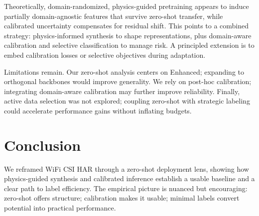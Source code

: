 \documentclass[journal]{IEEEtran}
\begin{document}
Theoretically, domain-randomized, physics-guided pretraining appears to induce partially domain-agnostic features that survive zero-shot transfer, while calibrated uncertainty compensates for residual shift. This points to a combined strategy: physics-informed synthesis to shape representations, plus domain-aware calibration and selective classification to manage risk. A principled extension is to embed calibration losses or selective objectives during adaptation.

Limitations remain. Our zero-shot analysis centers on Enhanced; expanding to orthogonal backbones would improve generality. We rely on post-hoc calibration; integrating domain-aware calibration may further improve reliability. Finally, active data selection was not explored; coupling zero-shot with strategic labeling could accelerate performance gains without inflating budgets.

\section{Conclusion}
We reframed WiFi CSI HAR through a zero-shot deployment lens, showing how physics-guided synthesis and calibrated inference establish a usable baseline and a clear path to label efficiency. The empirical picture is nuanced but encouraging: zero-shot offers structure; calibration makes it usable; minimal labels convert potential into practical performance.



\end{document}
